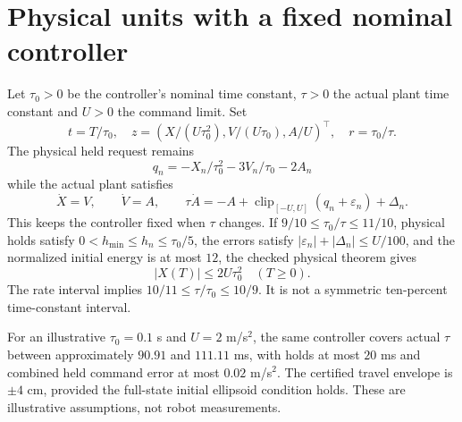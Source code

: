 \documentclass[10pt]{article}
\newcommand{\clip}{\operatorname{clip}}
\begin{document}
\section{Physical units with a fixed nominal controller}
Let $\tau_0>0$ be the controller's nominal time constant, $\tau>0$ the actual
plant time constant and $U>0$ the command limit. Set
\[
 t=T/\tau_0,\quad
 z=(X/(U\tau_0^2),V/(U\tau_0),A/U)^\top,\quad r=\tau_0/\tau.
\]
The physical held request remains
\[
 q_n=-X_n/\tau_0^2-3V_n/\tau_0-2A_n
\]
while the actual plant satisfies
\[
 \dot X=V,\qquad \dot V=A,\qquad
 \tau\dot A=-A+\clip_{[-U,U]}(q_n+\varepsilon_n)+\Delta_n.
\]
This keeps the controller fixed when $\tau$ changes.
If $9/10\le\tau_0/\tau\le11/10$, physical holds satisfy
$0<h_{\min}\le h_n\le\tau_0/5$, the errors satisfy
$|\varepsilon_n|+|\Delta_n|\le U/100$, and the normalized initial energy is at most
$12$, the checked physical theorem gives
\[
 |X(T)|\le2U\tau_0^2\quad(T\ge0).
\]
The rate interval implies $10/11\le\tau/\tau_0\le10/9$.
It is not a symmetric ten-percent time-constant interval.

For an illustrative $\tau_0=0.1$ s and $U=2$ m/s$^2$, the same controller covers
actual $\tau$ between approximately $90.91$ and $111.11$ ms, with holds at most
$20$ ms and combined held command error at most $0.02$ m/s$^2$.
The certified travel envelope is $\pm4$ cm, provided the full-state initial
ellipsoid condition holds. These are illustrative assumptions, not robot measurements.
\end{document}
